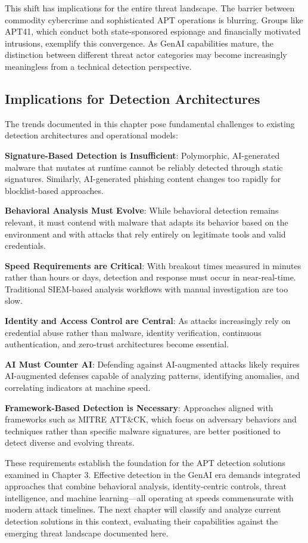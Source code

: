 This shift has implications for the entire threat landscape. The barrier between commodity cybercrime and sophisticated APT operations is blurring. Groups like APT41, which conduct both state-sponsored espionage and financially motivated intrusions, exemplify this convergence. As GenAI capabilities mature, the distinction between different threat actor categories may become increasingly meaningless from a technical detection perspective.

\subsection{Implications for Detection Architectures}

The trends documented in this chapter pose fundamental challenges to existing detection architectures and operational models:

\textbf{Signature-Based Detection is Insufficient}: Polymorphic, AI-generated malware that mutates at runtime cannot be reliably detected through static signatures. Similarly, AI-generated phishing content changes too rapidly for blocklist-based approaches.

\textbf{Behavioral Analysis Must Evolve}: While behavioral detection remains relevant, it must contend with malware that adapts its behavior based on the environment and with attacks that rely entirely on legitimate tools and valid credentials.

\textbf{Speed Requirements are Critical}: With breakout times measured in minutes rather than hours or days, detection and response must occur in near-real-time. Traditional SIEM-based analysis workflows with manual investigation are too slow.

\textbf{Identity and Access Control are Central}: As attacks increasingly rely on credential abuse rather than malware, identity verification, continuous authentication, and zero-trust architectures become essential.

\textbf{AI Must Counter AI}: Defending against AI-augmented attacks likely requires AI-augmented defenses capable of analyzing patterns, identifying anomalies, and correlating indicators at machine speed.

\textbf{Framework-Based Detection is Necessary}: Approaches aligned with frameworks such as MITRE ATT\&CK, which focus on adversary behaviors and techniques rather than specific malware signatures, are better positioned to detect diverse and evolving threats.

These requirements establish the foundation for the APT detection solutions examined in Chapter 3. Effective detection in the GenAI era demands integrated approaches that combine behavioral analysis, identity-centric controls, threat intelligence, and machine learning—all operating at speeds commensurate with modern attack timelines. The next chapter will classify and analyze current detection solutions in this context, evaluating their capabilities against the emerging threat landscape documented here.